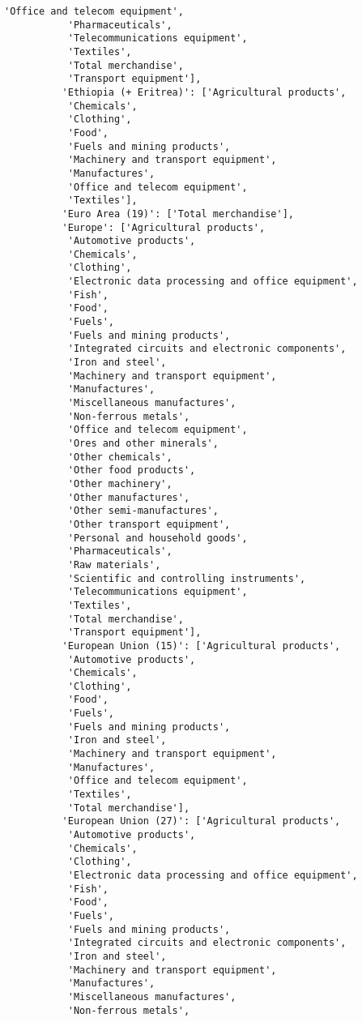 \documentclass[11pt]{article}
\begin{document}
\begin{Verbatim}[commandchars=\\\{\}]
           'Office and telecom equipment',
           'Pharmaceuticals',
           'Telecommunications equipment',
           'Textiles',
           'Total merchandise',
           'Transport equipment'],
          'Ethiopia (+ Eritrea)': ['Agricultural products',
           'Chemicals',
           'Clothing',
           'Food',
           'Fuels and mining products',
           'Machinery and transport equipment',
           'Manufactures',
           'Office and telecom equipment',
           'Textiles'],
          'Euro Area (19)': ['Total merchandise'],
          'Europe': ['Agricultural products',
           'Automotive products',
           'Chemicals',
           'Clothing',
           'Electronic data processing and office equipment',
           'Fish',
           'Food',
           'Fuels',
           'Fuels and mining products',
           'Integrated circuits and electronic components',
           'Iron and steel',
           'Machinery and transport equipment',
           'Manufactures',
           'Miscellaneous manufactures',
           'Non-ferrous metals',
           'Office and telecom equipment',
           'Ores and other minerals',
           'Other chemicals',
           'Other food products',
           'Other machinery',
           'Other manufactures',
           'Other semi-manufactures',
           'Other transport equipment',
           'Personal and household goods',
           'Pharmaceuticals',
           'Raw materials',
           'Scientific and controlling instruments',
           'Telecommunications equipment',
           'Textiles',
           'Total merchandise',
           'Transport equipment'],
          'European Union (15)': ['Agricultural products',
           'Automotive products',
           'Chemicals',
           'Clothing',
           'Food',
           'Fuels',
           'Fuels and mining products',
           'Iron and steel',
           'Machinery and transport equipment',
           'Manufactures',
           'Office and telecom equipment',
           'Textiles',
           'Total merchandise'],
          'European Union (27)': ['Agricultural products',
           'Automotive products',
           'Chemicals',
           'Clothing',
           'Electronic data processing and office equipment',
           'Fish',
           'Food',
           'Fuels',
           'Fuels and mining products',
           'Integrated circuits and electronic components',
           'Iron and steel',
           'Machinery and transport equipment',
           'Manufactures',
           'Miscellaneous manufactures',
           'Non-ferrous metals',

\end{Verbatim}
\end{document}

